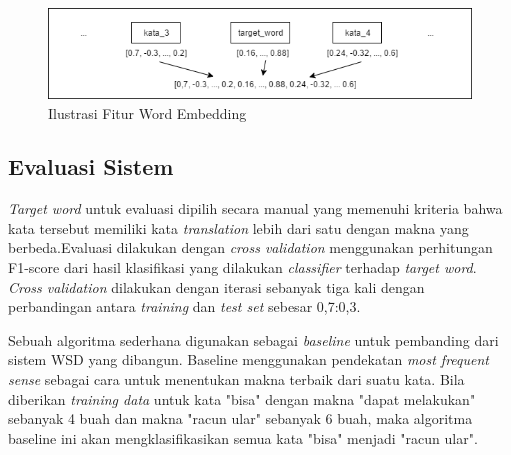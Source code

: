 \begin{figure}
	\centering
	\includegraphics[width=1\linewidth]{adit_pics/we-vector}
	\caption{Ilustrasi Fitur Word Embedding}
	\label{fig:Ilustrasi-Fitur-Word-Embedding}
\end{figure}


\subsection{Evaluasi Sistem}
\textit{Target word} untuk evaluasi dipilih secara manual yang memenuhi kriteria bahwa kata tersebut memiliki kata \textit{translation} lebih dari satu dengan makna yang berbeda.Evaluasi dilakukan dengan \textit{cross validation} menggunakan perhitungan F1-score dari hasil klasifikasi yang dilakukan \textit{classifier} terhadap \textit{target word}. \textit{Cross validation} dilakukan dengan iterasi sebanyak tiga kali dengan perbandingan antara \textit{training} dan \textit{test set} sebesar 0,7:0,3.

Sebuah algoritma sederhana digunakan sebagai \textit{baseline} untuk pembanding dari sistem WSD yang dibangun. Baseline menggunakan pendekatan \textit{most frequent sense} sebagai cara untuk menentukan makna terbaik dari suatu kata. Bila diberikan \textit{training data} untuk kata "bisa" dengan makna "dapat melakukan" sebanyak 4 buah dan makna "racun ular" sebanyak 6 buah, maka algoritma baseline ini akan mengklasifikasikan semua kata "bisa" menjadi "racun ular".

